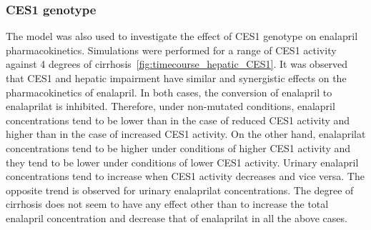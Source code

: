 \documentclass[pharmaceutics,article,submit,pdftex,moreauthors]{Definitions/mdpi}
\begin{document}

\subsubsection{CES1 genotype}\label{sec:results_ces1_scans}

The model was also used to investigate the effect of CES1 genotype on enalapril pharmacokinetics. Simulations were performed for a range of CES1 activity against 4 degrees of cirrhosis~\ref{fig:timecourse_hepatic_CES1}. It was observed that CES1 and hepatic impairment have similar and synergistic effects on the pharmacokinetics of enalapril. In both cases, the conversion of enalapril to enalaprilat is inhibited. Therefore, under non-mutated conditions, enalapril concentrations tend to be lower than in the case of reduced CES1 activity and higher than in the case of increased CES1 activity. On the other hand, enalaprilat concentrations tend to be higher under conditions of higher CES1 activity and they tend to be lower under conditions of lower CES1 activity. Urinary enalapril concentrations tend to increase when CES1 activity decreases and vice versa. The opposite trend is observed for urinary enalaprilat concentrations. The degree of cirrhosis does not seem to have any effect other than to increase the total enalapril concentration and decrease that of enalaprilat in all the above cases.

\end{document}
